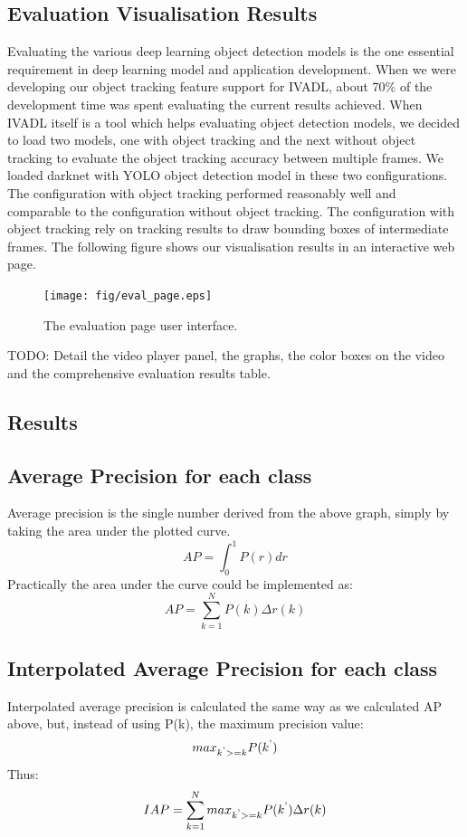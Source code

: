 \documentclass[conference]{IEEEtran}
\begin{document}
\subsection{Evaluation Visualisation Results}\label{sec.evalres}
Evaluating the various deep learning object detection models is the one essential requirement in deep learning model and application development. 
When we were developing our object tracking feature support for IVADL, about {70\%} of the development time was spent evaluating the current results achieved.
When IVADL itself is a tool which helps evaluating object detection models, we decided to load two models, one with object tracking and the next without object tracking to evaluate the object tracking accuracy between multiple frames.
We loaded darknet with YOLO object detection model in these two configurations. The configuration with object tracking performed reasonably well and comparable to the configuration without object tracking. The configuration with object tracking rely on tracking results to draw bounding boxes of intermediate frames.
The following figure shows our visualisation results in an interactive web page.
\begin{figure}[!htb]
\centering
\texttt{[image: fig/eval\_page.eps]}
\caption{The evaluation page user interface.} \label{fig.structure}
\end{figure}
TODO:
Detail the video player panel, the graphs, the color boxes on the video and the comprehensive evaluation results table.

\subsection{Results} \label{sec.results}
\subsection{Average Precision for each class}
	Average precision is the single number derived from the above graph, simply by taking the area under the plotted curve.
	$${AP} = \int_{0}^{1} P(r) dr$$
	Practically the area under the curve could be implemented as:
	$${AP} = \sum_{k=1}^{N} P(k) {\Delta}r(k)$$
\subsection{Interpolated Average Precision for each class}
	Interpolated average precision is calculated the same way as we calculated {AP} above, but, instead of using {P(k)}, the maximum precision value: 
	$${max}_{k\textsuperscript{'}>= k} {P(k\textsuperscript{'})}$$
	Thus:
	$${IAP} = \sum_{k=1}^{N} {max}_{k\textsuperscript{'}>= k} {P(k\textsuperscript{'})} {\Delta}r(k)$$
\end{document}
